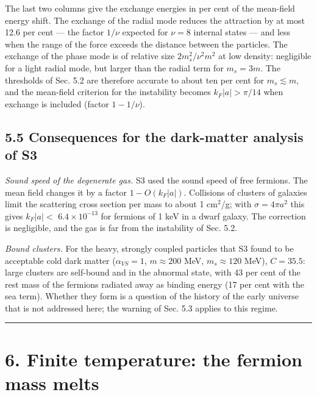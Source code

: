 \documentclass[
  10pt,
]{article}
\begin{document}
The last two columns give the exchange energies in per cent of the
mean-field energy shift. The exchange of the radial mode reduces the
attraction by at most 12.6 per cent --- the factor \(1/\nu\) expected
for \(\nu=8\) internal states --- and less when the range of the force
exceeds the distance between the particles. The exchange of the phase
mode is of relative size \(2m_s^2/\nu^2m^2\) at low density: negligible
for a light radial mode, but larger than the radial term for \(m_s=3m\).
The thresholds of Sec. 5.2 are therefore accurate to about ten per cent
for \(m_s\lesssim m\), and the mean-field criterion for the instability
becomes \(k_F|a|>\pi/14\) when exchange is included (factor
\(1-1/\nu\)).

\hypertarget{consequences-for-the-dark-matter-analysis-of-s3}{%
\subsection{5.5 Consequences for the dark-matter analysis of
S3}\label{consequences-for-the-dark-matter-analysis-of-s3}}

\emph{Sound speed of the degenerate gas.} S3 used the sound speed of
free fermions. The mean field changes it by a factor \(1-O(k_F|a|)\).
Collisions of clusters of galaxies limit the scattering cross section
per mass to about 1 cm\(^2\)/g; with \(\sigma=4\pi a^2\) this gives
\(k_F|a|<\) \(6.4\times10^{-13}\) for fermions of 1 keV in a dwarf
galaxy. The correction is negligible, and the gas is far from the
instability of Sec. 5.2.

\emph{Bound clusters.} For the heavy, strongly coupled particles that S3
found to be acceptable cold dark matter (\(\alpha_{VS}=1\),
\(m\approx200\) MeV, \(m_s\approx120\) MeV), \(C=35.5\): large clusters
are self-bound and in the abnormal state, with 43 per cent of the rest
mass of the fermions radiated away as binding energy (17 per cent with
the sea term). Whether they form is a question of the history of the
early universe that is not addressed here; the warning of Sec. 5.3
applies to this regime.

\begin{center}\rule{0.5\linewidth}{0.5pt}\end{center}

\hypertarget{finite-temperature-the-fermion-mass-melts}{%
\section{6. Finite temperature: the fermion mass
melts}\label{finite-temperature-the-fermion-mass-melts}}
\end{document}

